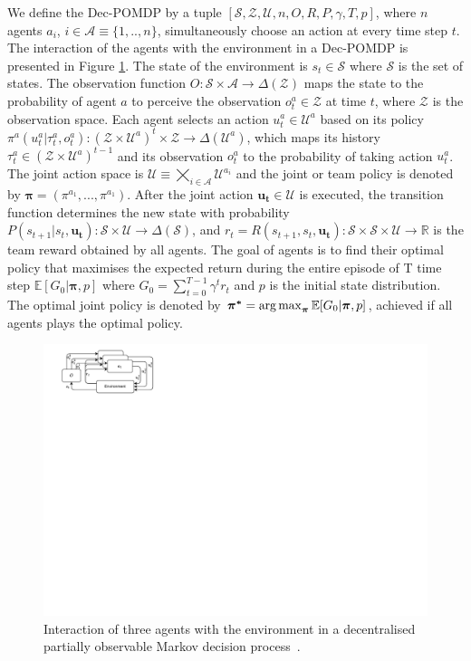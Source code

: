 We define the Dec-POMDP by a tuple $[\mathcal{S}, \mathcal{Z}, \mathcal{U}, n, O, R, P, \gamma, T, p]$, where $n$ agents $a_i$, $i \in \mathcal{A} \equiv \{1,..,n\}$, simultaneously choose an action at every time step $t$.
The interaction of the agents with the environment in a Dec-POMDP is presented in Figure \ref{fig:ch3_decpomdp}.
The state of the environment is $s_t \in \mathcal{S}$ where $\mathcal{S}$ is the set of states.
The observation function $O:\mathcal{S} \times \mathcal{A} \rightarrow \Delta(\mathcal{Z})$ maps the state to the probability of agent $a$ to perceive the observation $o_t^{a} \in \mathcal{Z}$ at time $t$, where $\mathcal{Z}$ is the observation space.
Each agent selects an action $u_t^{a} \in \mathcal{U}^{a}$ based on its policy $\pi^{a}(u_t^{a}|\tau_t^{a},o_t^{a}): (\mathcal{Z} \times \mathcal{U}^a)^t \times \mathcal{Z}\rightarrow \Delta(\mathcal{U}^a)$, which maps its history $\tau_t^{a} \in (\mathcal{Z} \times \mathcal{U}^a)^{t-1}$ and its observation $o_t^{a}$ to the probability of taking action $u_t^{a}$. 
The joint action space is $\mathcal{U} \equiv \bigtimes_{i \in \mathcal{A}} \mathcal{U}^{a_i}$ and the joint or team policy is denoted by $\mathbf{\pi}=(\pi^{a_1},...,\pi^{a_1})$.
After the joint action $\mathbf{u_t} \in \mathcal{U}$ is executed, the transition function determines the new state with probability $P(s_{t+1}|s_t, \mathbf{u_t}): \mathcal{S} \times\mathcal{U} \rightarrow  \Delta(\mathcal{S}) $, and $r_t=R(s_{t+1}, s_t, \mathbf{u_t}): \mathcal{S} \times \mathcal{S} \times \mathcal{U} \rightarrow \mathbb{R}$ is the team reward obtained by all agents.
The goal of agents is to find their optimal policy that maximises the expected return during the entire episode of T time step $\mathbb{E}[G_0|\mathbf{\pi}, p]$ where $G_0=\sum_{t=0}^{T-1} \gamma^{t} r_{t}$ and $p$ is the initial state distribution.
The optimal joint policy is denoted by $\mathbf{\pi^{*}} =\argmax_{\mathbf{\pi}} \mathbb{E}[G_0|\mathbf{\pi}, p]$, achieved if all agents plays the optimal policy.

\begin{figure}
    \centering
    \includegraphics[width=0.8\linewidth]{tex_thesis/figures/ch3/decpomdp.pdf}
    \caption{Interaction of three agents with the environment in a decentralised partially observable Markov decision process~\citep{DecPomdp}.}
    \label{fig:ch3_decpomdp}
\end{figure}

